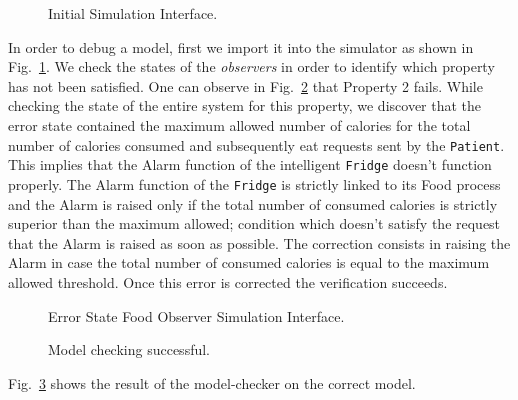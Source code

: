 \documentclass[a4paper,twoside]{article}
\begin{document}
\begin{figure}[!h]
  \centering
  {}
  \caption{Initial Simulation Interface.}
  \label{fig:initialsimulationinterface}
 \end{figure}

In order to  debug  a model, first we import it into the simulator as shown in Fig.~\ref{fig:initialsimulationinterface}. We check the states of the \textit{observers} in order to identify which property has not been satisfied. One can observe in Fig.~\ref{fig:errorstatefoodobserver} that Property 2 fails. While checking the state of the entire system for this property, we discover that the error state contained the maximum allowed number of calories for the total number of calories consumed and subsequently eat requests sent by the \texttt{Patient}. This implies that the Alarm function of the intelligent \texttt{Fridge} doesn't function properly. The Alarm function of the \texttt{Fridge} is strictly linked to its Food process and the Alarm is raised only if the total number of consumed calories is strictly superior than the maximum allowed; condition which doesn't satisfy the request that the Alarm is raised as soon as possible. The correction consists in raising the Alarm in case the total number of consumed calories is equal to the maximum allowed threshold. Once this error is corrected the verification succeeds.

\begin{figure}[!h]
  \centering
  {}
  \caption{Error State Food Observer Simulation Interface.}
  \label{fig:errorstatefoodobserver}
 \end{figure}

\begin{figure}[!h]
  \centering
  {}
  \caption{Model checking successful.}
  \label{fig:verificationok}
 \end{figure} 

Fig.~\ref{fig:verificationok} shows the result of the model-checker on the correct model.
\end{document}
